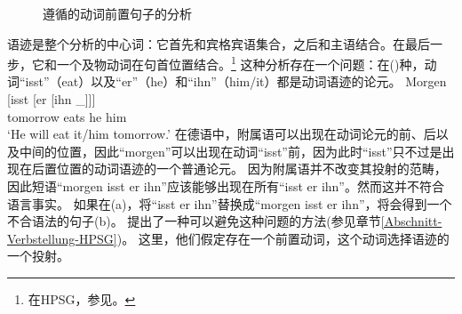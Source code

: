 \begin{figure}
\caption{\label{Abbildung-CG-isst-der-junge-den-kuchen-jacobs}遵循\citet{Jacobs91a}的动词前置句子的分析}
\end{figure}%
语迹是整个分析的中心词：它首先和宾格宾语集合，之后和主语结合。在最后一步，它和一个及物动词在句首位置结合。\footnote{在HPSG，参见。
} 
这种分析存在一个问题：在()种，动词``{isst}''（eat）以及``{er}''（he）和``{ihn}''（him/it）都是动词语迹的论元。
\ea
\gll Morgen [isst [er [ihn \_]]]\\
	 tomorrow \spacebr{}eats \spacebr{}he \spacebr{}him\\
\glt `He will eat it/him tomorrow.'
\z
在德语中，附属语可以出现在动词论元的前、后以及中间的位置，因此``morgen''可以出现在动词``isst''前，因为此时``isst''只不过是出现在后置位置的动词语迹的一个普通论元。
因为附属语并不改变其投射的范畴，因此短语``{morgen isst er ihn}''应该能够出现在所有``{isst er ihn}''。然而这并不符合语言事实。
如果在(a)，将``{isst er ihn}''替换成``{morgen isst er ihn}''，将会得到一个不合语法的句子(b)。
\eal
{}
\zl
\citet{KW91a}提出了一种可以避免这种问题的方法(参见章节\ref{Abschnitt-Verbstellung-HPSG})。
这里，他们假定存在一个前置动词，这个动词选择语迹的一个投射。
